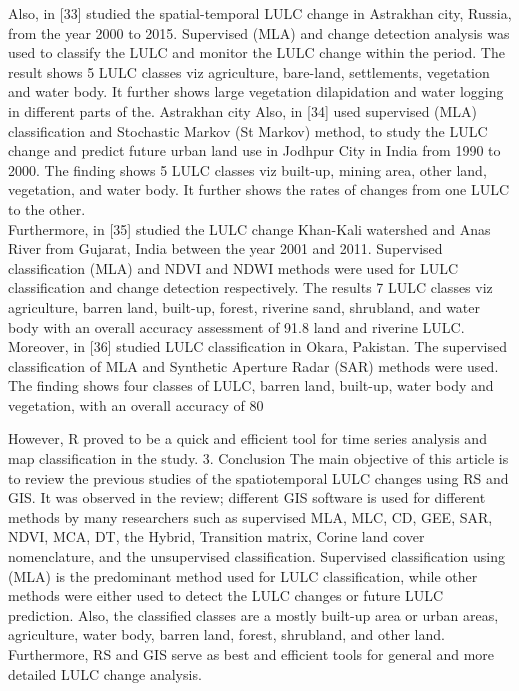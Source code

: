 \documentclass[12pt,a4paper]{article}
\begin{document}
	Also, in [33] studied the spatial-temporal LULC change in Astrakhan city, Russia, from the year 2000 to 2015. Supervised (MLA)	and change detection analysis was used to classify the LULC and	monitor the LULC change within the period. The result shows 5	LULC classes viz agriculture, bare-land, settlements, vegetation	and water body. It further shows large vegetation dilapidation and	water logging in different parts of the. Astrakhan city	Also, in [34] used supervised (MLA) classification and Stochastic	Markov (St Markov) method, to study the LULC change and predict future urban land use in Jodhpur City in India from 1990 to	2000. The finding shows 5 LULC classes viz built-up, mining area,	other land, vegetation, and water body. It further shows the rates	of changes from one LULC to the other.\\
	
	Furthermore, in [35] studied the LULC change Khan-Kali watershed and Anas River from Gujarat, India between the year 2001	and 2011. Supervised classification (MLA) and NDVI and NDWI	methods were used for LULC classification and change detection	respectively. The results 7 LULC classes viz agriculture, barren	land, built-up, forest, riverine sand, shrubland, and water body	with an overall accuracy assessment of 91.8%
	land and riverine LULC.\\
	
	Moreover, in [36] studied LULC classification in Okara, Pakistan.	The supervised classification of MLA and Synthetic Aperture	Radar (SAR) methods were used. The finding shows four classes	of LULC, barren land, built-up, water body and vegetation, with	an overall accuracy of 80 %
	
	However, R proved to be a quick and efficient tool for time series analysis and map classification in the study.
	3. Conclusion
	The main objective of this article is to review the previous studies	of the spatiotemporal LULC changes using RS and GIS. It was	observed in the review; different GIS software is used for different	methods by many researchers such as supervised MLA, MLC,	CD, GEE, SAR, NDVI, MCA, DT, the Hybrid, Transition matrix,	Corine land cover nomenclature, and the unsupervised classification. Supervised classification using (MLA) is the predominant	method used for LULC classification, while other methods were	either used to detect the LULC changes or future LULC prediction. Also, the classified classes are a mostly built-up area or urban areas, agriculture, water body, barren land, forest, shrubland,
	and other land. Furthermore, RS and GIS serve as best and efficient tools for general and more detailed LULC change analysis.\\
	
\end{document}

